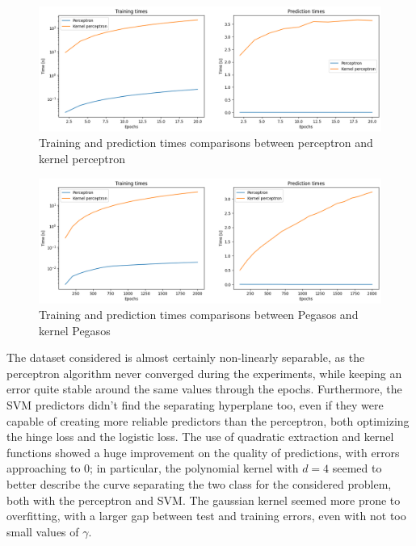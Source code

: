 \documentclass{article}
\begin{document}
\begin{figure}
	\centering
	\includegraphics[width=\columnwidth]{../plots/time_perceptron.png}
	\caption{Training and prediction times comparisons between perceptron and kernel perceptron}
	\label{fig:time_perceptron}
\end{figure}
\begin{figure}
	\centering
	\includegraphics[width=\columnwidth]{../plots/time_svm.png}
	\caption{Training and prediction times comparisons between Pegasos and kernel Pegasos}
	\label{fig:time_svm}
\end{figure}

The dataset considered is almost certainly non-linearly separable, as the perceptron algorithm never converged during the experiments, while keeping an error quite stable around the same values through the epochs. Furthermore, the SVM predictors didn't find the separating hyperplane too, even if they were capable of creating more reliable predictors than the perceptron, both optimizing the hinge loss and the logistic loss. The use of quadratic extraction and kernel functions showed a huge improvement on the quality of predictions, with errors approaching to 0; in particular, the polynomial kernel with $d=4$ seemed to better describe the curve separating the two class for the considered problem, both with the perceptron and SVM. The gaussian kernel seemed more prone to overfitting, with a larger gap between test and training errors, even with not too small values of $\gamma$. 
\end{document}
